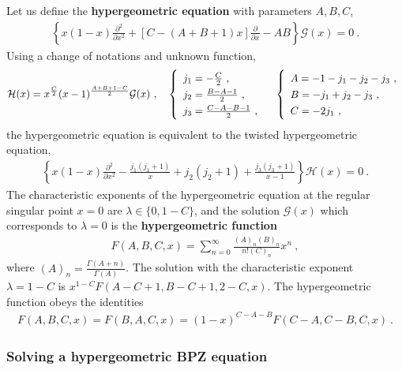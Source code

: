 \documentclass[12pt, a4paper, notitlepage, twoside]{report}
\numberwithin{equation}{section}
\theoremstyle{break}
\begin{document}
 Let us define the \textbf{\boldmath hypergeometric equation} with parameters $A,B,C$, 
\begin{align}
 \left\{ x(1-x) \frac{\partial^2}{\partial x^2} +\left[C-(A+B+1)x\right]{\frac{\partial}{\partial x}} - AB \right\} \mathcal{G}(x)= 0\ .
\label{dzp}
\end{align}
Using a change of notations and unknown function,
\begin{align}
 \mathcal{H}(x)= x^{\frac{C}{2}} (x-1)^{\frac{A+B+1-C}{2}}\mathcal{G}(x)\ , \quad \renewcommand{\arraystretch}{1.3}\left\{\begin{array}{l}  j_1 = -\frac{C}{2} \ , \\ j_2=\frac{B-A-1}{2} \ , \\  j_3= \frac{C-A-B-1}{2}\ , \end{array}\right.    
\quad \left\{\begin{array}{l}  A = -1-j_1-j_2-j_3\ , \\ B = -j_1+j_2-j_3\ , \\ C = -2j_1\ , \end{array}\right. 
\end{align}
the hypergeometric equation is equivalent to the twisted hypergeometric equation,
\begin{align}
 \left\{ x(1-x) \frac{\partial^2}{\partial x^2}  -\frac{j_1(j_1+1)}{x}+ j_2(j_2+1)+\frac{j_3(j_3+1)}{x-1}\right\} \mathcal{H}(x) = 0\ .
\label{hj}
\end{align}
The characteristic exponents of the hypergeometric equation at the regular singular point $x=0$ are $\lambda\in \{0,1-C\}$, and the solution $\mathcal{G}(x)$ which corresponds to $\lambda=0$
 is the \textbf{\boldmath hypergeometric function}
\begin{align}
 F(A,B,C,x) = \sum_{n=0}^\infty \frac{(A)_n(B)_n}{n!(C)_n}x^n\ ,
\label{fsn}
\end{align}
where $(A)_n = \frac{\Gamma(A+n)}{\Gamma(A)}$.
The solution with the characteristic exponent $\lambda=1-C$ is $x^{1-C}F(A-C+1,B-C+1,2-C,x)$.
The hypergeometric function obeys the identities 
\begin{align}
 F(A,B,C,x) = F(B,A,C,x) = (1-x)^{C-A-B} F(C-A,C-B,C,x)\ .
\label{fff}
\end{align}

\subsubsection{Solving a hypergeometric BPZ equation}
\end{document}
